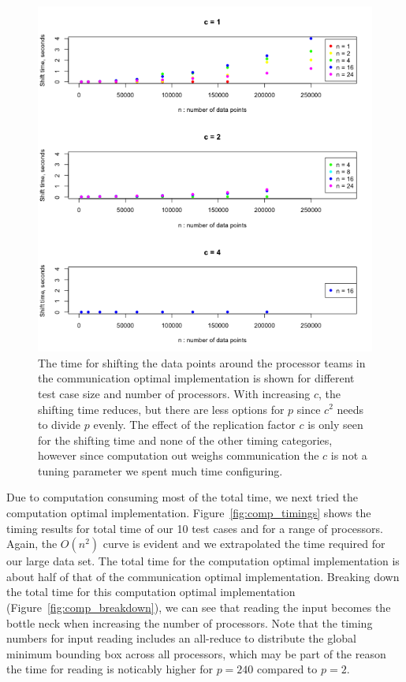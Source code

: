 \begin{figure}[!h]
   \centering
   \includegraphics[width=\textwidth]{./fig/comm_allc_comm.png} %
   \caption{The time for shifting the data points around the processor teams in the communication optimal implementation is shown for different test case size and number of processors. With increasing $c$, the shifting time reduces, but there are less options for $p$ since $c^2$ needs to divide $p$ evenly. The effect of the replication factor $c$ is only seen for the shifting time and none of the other timing categories, however since computation out weighs communication the $c$ is not a tuning parameter we spent much time configuring.}
   \label{fig:comm_allc_comm}
\end{figure}

Due to computation consuming most of the total time, we next tried the computation optimal implementation. Figure~\ref{fig:comp_timings} shows the timing results for total time of our 10 test cases and for a range of processors. Again, the $O(n^2)$ curve is evident and we extrapolated the time required for our large data set. The total time for the computation optimal implementation is about half of that of the communication optimal implementation. Breaking down the total time for this computation optimal implementation (Figure~\ref{fig:comp_breakdown}), we can see that reading the input becomes the bottle neck  when increasing the number of processors. Note that the timing numbers for input reading includes an all-reduce to distribute the global minimum bounding box across all processors, which may be part of the reason the time for reading is noticably higher for $p = 240$ compared to $p = 2$.

